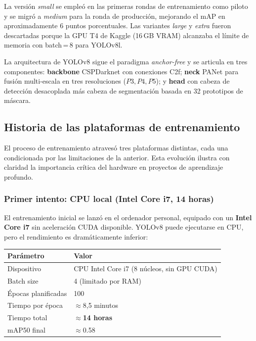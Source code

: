 \documentclass[12pt,a4paper]{article}
\begin{document}
La versión \emph{small} se empleó en las primeras rondas de entrenamiento como piloto
y se migró a \emph{medium} para la ronda de producción, mejorando el mAP en
aproximadamente 6 puntos porcentuales. Las variantes \emph{large} y \emph{extra} fueron
descartadas porque la GPU T4 de Kaggle (16\,GB VRAM) alcanzaba el límite de memoria
con batch\,=\,8 para YOLOv8l.

La arquitectura de YOLOv8 sigue el paradigma \emph{anchor-free} y se articula en tres
componentes: \textbf{backbone} CSPDarknet con conexiones C2f; \textbf{neck} PANet para
fusión multi-escala en tres resoluciones ($P3, P4, P5$); y \textbf{head} con cabeza de
detección desacoplada más cabeza de segmentación basada en 32 prototipos de máscara.

\subsection{Historia de las plataformas de entrenamiento}
\label{sec:plataformas}

El proceso de entrenamiento atravesó tres plataformas distintas, cada una condicionada
por las limitaciones de la anterior. Esta evolución ilustra con claridad la importancia
crítica del hardware en proyectos de aprendizaje profundo.

\subsubsection{Primer intento: CPU local (Intel Core i7, 14 horas)}

El entrenamiento inicial se lanzó en el ordenador personal, equipado con un
\textbf{Intel Core i7} sin aceleración CUDA disponible. YOLOv8 puede ejecutarse en CPU,
pero el rendimiento es dramáticamente inferior:

\begin{center}
\begin{tabular}{ll}
  \toprule
  \textbf{Parámetro} & \textbf{Valor} \\
  \midrule
  Dispositivo         & CPU Intel Core i7 (8 núcleos, sin GPU CUDA) \\
  Batch size          & 4 (limitado por RAM) \\
  Épocas planificadas & 100 \\
  Tiempo por época    & $\approx$8,5 minutos \\
  Tiempo total        & $\approx$\textbf{14 horas} \\
  mAP50 final         & $\approx$0.58 \\
  \bottomrule
\end{tabular}
\end{center}
\end{document}
